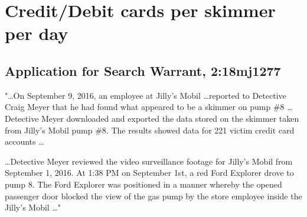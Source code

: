 \begin{comment}
\subsection{Skimmer residence time}
\label{sec:appendix:residencetime}

\subsubsection*{USA v. Rodriguez et al \cite{rodriguez}}
"\dots On or about April 4, 2016, Defendant ... installed a skimmer device on the point of sale terminal inside a gas pump located at a Circle K Gas Station in Fairview Park ... skimmer device was discovered on the gas pump by an employee on or about April 15, 2016 \dots

\dots On or about April 17, 2016, unknown members of the conspiracy installed a skimmer device on the point of sale terminal inside a gas pump at the Circle K Gas Station \dots skimmer was discovered by employees on or about April 19, 2016 \dots"

\subsubsection*{Application for Search Warrant, 2:18mj704 \cite{conde}}
"\dots (Victim \#1) whose debit card had been compromised and used at a Home Depot in an attempt to purchase a gift card \dots Victim \#1 stated he had only used that card once, on June 10, 2018, at the same gas station and pump where the skimmer device was recovered on June 21, 2018 \dots" 
\end{comment}
\section{Credit/Debit cards per skimmer per day}
\label{sec:appendix:cardsperskimmer}

\subsection*{Application for Search Warrant, 2:18mj1277 \cite{estrada}}
"\dots On September 9, 2016, an employee at Jilly's Mobil \dots reported to Detective Craig Meyer that he had found what appeared to be a skimmer on pump \#8 \dots Detective Meyer downloaded and exported the data stored on the skimmer taken from Jilly's Mobil pump \#8. The results showed data for 221 victim credit card accounts \dots

\dots Detective Meyer reviewed the video surveillance footage for Jilly's Mobil from September 1, 2016. At 1:38 PM on September 1st, a red Ford Explorer drove to pump 8. The Ford Explorer was positioned in a manner whereby the opened passenger door blocked the view of the gas pump by the store employee inside the Jilly's Mobil \dots"
